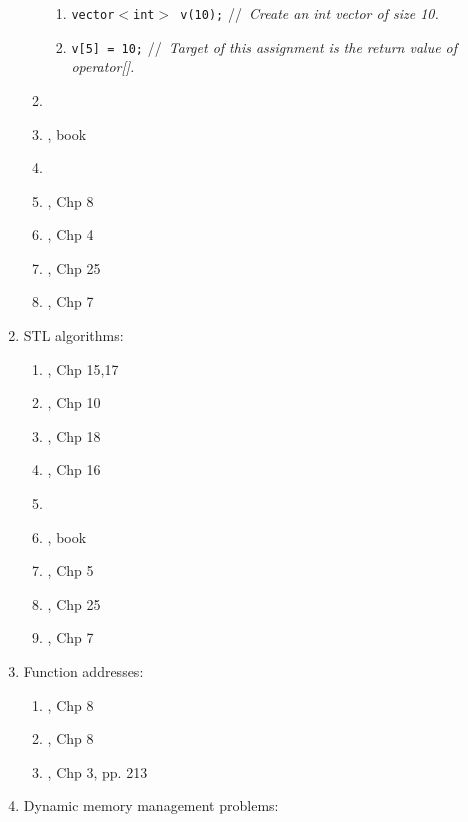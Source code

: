 \begin{enumerate}
\begin{enumerate}
\begin{enumerate}
		\item {\tt vector$<$int$>$ v(10);} \hspace{0.2in} //{\it\ Create an int vector of size 10.}
		\item {\tt v[5] = 10;} //{\it\ Target of this assignment is the return value of operator[].}
		\end{enumerate}
	\item \cite[\S18.2, pp. 960--977]{Savitch2009}
	\item \cite{Reese2006a}, book
	\item \cite[Chp. 8]{Scheinerman2006}
	\item \cite{Schildt2004a}, Chp 8
	\item \cite{Eckel2003}, Chp 4
	\item \cite{Oualline2003}, Chp 25
	\item \cite{Vermeir2001}, Chp 7
	\end{enumerate}
\item STL algorithms: \vspace{-0.3cm}
	\begin{enumerate} \itemsep -2pt
	\item \cite{Gregoire2014}, Chp 15,17
	\item \cite{Lippman2013}, Chp 10
	\item \cite{Allain2012}, Chp 18
	\item \cite{Prata2012}, Chp 16
	\item \cite[\S18.3, pp. 977-991]{Savitch2009}
	\item \cite{Reese2006a}, book
	\item \cite{Eckel2003}, Chp 5
	\item \cite{Oualline2003}, Chp 25
	\item \cite{Vermeir2001}, Chp 7
	\end{enumerate}
\item Function addresses: \vspace{-0.3cm}
	\begin{enumerate} \itemsep -2pt
	\item \cite{Stroustrup2014}, Chp 8
	\item \cite{Stroustrup2009}, Chp 8
	\item \cite{Eckel2000}, Chp 3, pp. 213
	\end{enumerate}
\item Dynamic memory management problems: \vspace{-0.3cm}

\end{enumerate}
